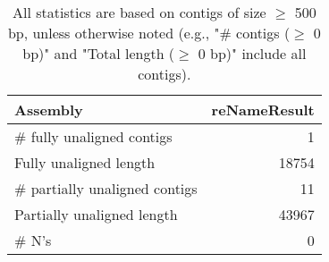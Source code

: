 \documentclass[12pt,a4paper]{article}
\begin{document}
\begin{table}[ht]
\begin{center}
\caption{All statistics are based on contigs of size $\geq$ 500 bp, unless otherwise noted (e.g., "\# contigs ($\geq$ 0 bp)" and "Total length ($\geq$ 0 bp)" include all contigs).}
\begin{tabular}{|l*{1}{|r}|}
\hline
Assembly & reNameResult \\ \hline
\# fully unaligned contigs & 1 \\ \hline
Fully unaligned length & 18754 \\ \hline
\# partially unaligned contigs & 11 \\ \hline
Partially unaligned length & 43967 \\ \hline
\# N's & 0 \\ \hline
\end{tabular}
\end{center}
\end{table}
\end{document}
